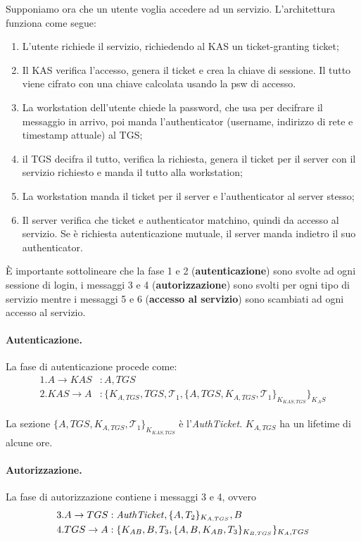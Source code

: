 \documentclass[a4paper, 11pt, twoside]{article}
\begin{document}
	Supponiamo ora che un utente voglia accedere ad un servizio. L'architettura funziona come segue: \begin{enumerate}
		\item L'utente richiede il servizio, richiedendo al KAS un ticket-granting ticket;
		\item Il KAS verifica l'accesso, genera il ticket e crea la chiave di sessione. Il tutto viene cifrato con una chiave calcolata usando la psw di accesso.
		\item La workstation dell'utente chiede la password, che usa per decifrare il messaggio in arrivo, poi manda l'authenticator (username, indirizzo di rete e timestamp attuale) al TGS;
		\item il TGS decifra il tutto, verifica la richiesta, genera il ticket per il server con il servizio richiesto e manda il tutto alla workstation;
		\item La workstation manda il ticket per il server e l'authenticator al server stesso;
		\item Il server verifica che ticket e authenticator matchino, quindi da accesso al servizio. Se è richiesta autenticazione mutuale, il server manda indietro il suo authenticator.
	\end{enumerate}

	È importante sottolineare che la fase 1 e 2 (\textbf{autenticazione}) sono svolte ad ogni sessione di login, i messaggi 3 e 4 (\textbf{autorizzazione}) sono svolti per ogni tipo di servizio mentre i messaggi 5 e 6 (\textbf{accesso al servizio}) sono scambiati ad ogni accesso al servizio.

	\paragraph{Autenticazione.} La fase di autenticazione procede come: \begin{align*}
		1.A \to KAS&: A, TGS \\
		2.KAS \to A&: \lbrace K_{A, TGS}, TGS, \mathcal{T}_1, \lbrace A, TGS, K_{A, TGS}, \mathcal{T}_1  \rbrace_{K_{KAS, TGS}}\rbrace_{K_AS}
	\end{align*}

	La sezione $\lbrace A, TGS, K_{A, TGS}, \mathcal{T}_1  \rbrace_{K_{KAS, TGS}}$ è l'\textit{AuthTicket}. $K_{A, TGS}$ ha un lifetime di alcune ore. 

	\paragraph{Autorizzazione.}
	La fase di autorizzazione contiene i messaggi 3 e 4, ovvero \begin{align*}
		3.A \to TGS&: \text{\textit{AuthTicket}}, \lbrace A, T_2\rbrace_{K_{A, TGS}}, B\\
		4.TGS \to A&:\lbrace K_{AB}, B, T_3, \lbrace A, B, K_{AB}, T_3\rbrace_{K_{B, TGS}} \rbrace_{K_A, TGS}
	\end{align*}
\end{document}
